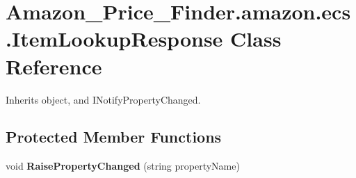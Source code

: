 \hypertarget{class_amazon___price___finder_1_1amazon_1_1ecs_1_1_item_lookup_response}{\section{Amazon\-\_\-\-Price\-\_\-\-Finder.\-amazon.\-ecs.\-Item\-Lookup\-Response Class Reference}
\label{class_amazon___price___finder_1_1amazon_1_1ecs_1_1_item_lookup_response}
}


 




Inherits object, and I\-Notify\-Property\-Changed.

\subsection*{Protected Member Functions}
\begin{DoxyCompactItemize}
\item 
\hypertarget{class_amazon___price___finder_1_1amazon_1_1ecs_1_1_item_lookup_response_a90e7fd2a56fad9ebf89bac1c47a9fd67}{void {\bfseries Raise\-Property\-Changed} (string property\-Name)}\label{class_amazon___price___finder_1_1amazon_1_1ecs_1_1_item_lookup_response_a90e7fd2a56fad9ebf89bac1c47a9fd67}

\end{DoxyCompactItemize}
